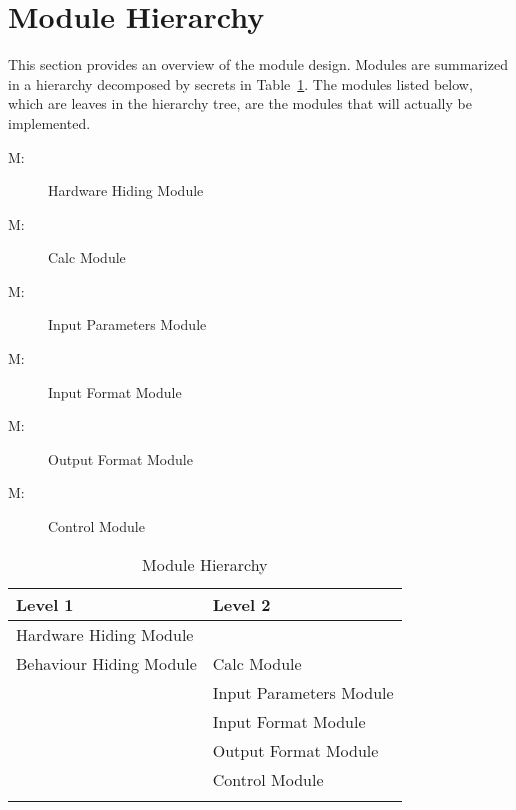 \documentclass[12pt]{article}
\newcounter{modnum}
\newcommand{\mthemodnum}{M\themodnum}
\begin{document}
\section{Module Hierarchy}
\label{Sec:MH}
This section provides an overview of the module design. Modules are summarized in a hierarchy decomposed by secrets in Table~\ref{Table:MH}. The modules listed below, which are leaves in the hierarchy tree, are the modules that will actually be implemented.
\begin{description}
\item[\mthemodnum\label{MhwHiding}:]Hardware Hiding Module
\end{description}
\begin{description}
\item[\mthemodnum\label{Mmodcalcdesc}:]Calc Module
\end{description}
\begin{description}
\item[\mthemodnum\label{MmodInputParams}:]Input Parameters Module
\end{description}
\begin{description}
\item[\mthemodnum\label{MmodInputFormat}:]Input Format Module
\end{description}
\begin{description}
\item[\mthemodnum\label{Mmodoutputfdesc}:]Output Format Module
\end{description}
\begin{description}
\item[\mthemodnum\label{MmodControl}:]Control Module
\end{description}
\begin{longtable}{l l}
\toprule
Level 1 & Level 2
\\
\midrule
Hardware Hiding Module & 
\\
Behaviour Hiding Module & Calc Module
\\
 & Input Parameters Module
\\
 & Input Format Module
\\
 & Output Format Module
\\
 & Control Module
\\
\bottomrule
\caption{Module Hierarchy}
\label{Table:MH}
\end{longtable}
\end{document}
